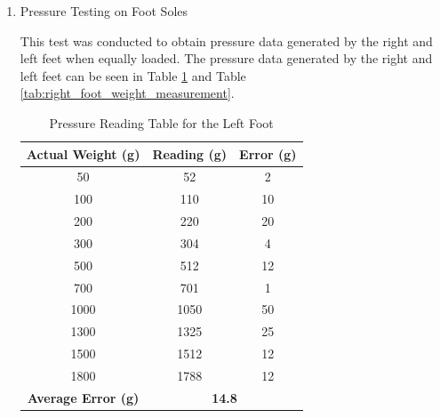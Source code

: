 \begin{enumerate}[label=\Alph*.]
    \item Pressure Testing on Foot Soles
    \label{subsec:results-discussion-pressure}

        \hspace*{1em} This test was conducted to obtain pressure data generated by the right and left feet when equally loaded. The pressure data generated by the right and left feet can be seen in Table \ref{tab:left_foot_weight_measurement} and Table \ref{tab:right_foot_weight_measurement}.

        \begin{table}[h!]
            \centering
            \caption{Pressure Reading Table for the Left Foot}
            \begin{tabular}{|c|c|c|}
                \hline
                \textbf{Actual Weight (g)} & \textbf{Reading (g)} & \textbf{Error (g)} \\
                \hline
                50    & 52    & 2   \\
                100   & 110   & 10  \\
                200   & 220   & 20  \\
                300   & 304   & 4   \\
                500   & 512   & 12  \\
                700   & 701   & 1   \\
                1000  & 1050  & 50  \\
                1300  & 1325  & 25  \\
                1500  & 1512  & 12  \\
                1800  & 1788  & 12  \\
                \hline
                \textbf{Average Error (g)} & \multicolumn{2}{c|}{\textbf{14.8}} \\
                \hline
            \end{tabular}
            \label{tab:left_foot_weight_measurement}
        \end{table}


\end{enumerate}
